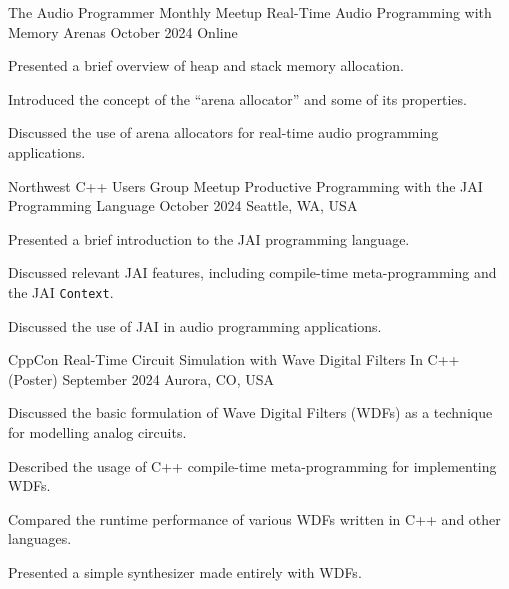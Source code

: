 

\begin{cventries}

  \cventry
    {The Audio Programmer Monthly Meetup} %
    {Real-Time Audio Programming with Memory Arenas} %
    {October 2024} %
    {Online} %
    {
      \begin{cvitems} %
        \item {Presented a brief overview of heap and stack memory allocation.}
        \item {Introduced the concept of the ``arena allocator'' and some of its properties.}
        \item {Discussed the use of arena allocators for real-time audio programming applications.}
      \end{cvitems}
    }

  \cventry
    {Northwest C++ Users Group Meetup} %
    {Productive Programming with the JAI Programming Language} %
    {October 2024} %
    {Seattle, WA, USA} %
    {
      \begin{cvitems} %
        \item {Presented a brief introduction to the JAI programming language.}
        \item {Discussed relevant JAI features, including compile-time meta-programming and the JAI \texttt{Context}.}
        \item {Discussed the use of JAI in audio programming applications.}
      \end{cvitems}
    }

  \cventry
    {CppCon} %
    {Real-Time Circuit Simulation with Wave Digital Filters In C++ (Poster)} %
    {September 2024} %
    {Aurora, CO, USA} %
    {
      \begin{cvitems} %
        \item {Discussed the basic formulation of Wave Digital Filters (WDFs) as a technique for modelling analog circuits.}
        \item {Described the usage of C++ compile-time meta-programming for implementing WDFs.}
        \item {Compared the runtime performance of various WDFs written in C++ and other languages.}
        \item {Presented a simple synthesizer made entirely with WDFs.}
      \end{cvitems}
    }


\end{cventries}
